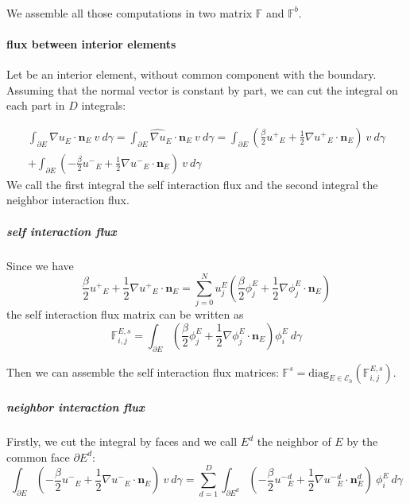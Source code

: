 \documentclass[a4paper,10pt,draft]{article}
\begin{document}
\paragraph{}
We assemble all those computations in two matrix $\mathbb{F}$ and $\mathbb{F}^b$.

\iffalse

\paragraph{flux between interior elements}

Let be an interior element, without common component with the boundary. Assuming that the normal 
vector is constant by part, we can cut the integral on each part in $D$ integrals:

\begin{multline*}
 \int_{\partial E} \widehat{\nabla u}_E \cdot \mathbf{n}_E\ v\ d\gamma 
 = \int_{\partial E} \widehat{\nabla u}_E \cdot \mathbf{n}_E\ v\ d\gamma
 = \int_{\partial E} \left( \frac{\beta}{2} {u^+}_E + \frac{1}{2} \nabla {u^+}_E \cdot \mathbf{n}_E 
\right) \ v\ d\gamma \\
+ \int_{\partial E} \left( -\frac{\beta}{2} {u^-}_E + \frac{1}{2} \nabla {u^-}_E \cdot \mathbf{n}_E 
\right) \ v\ d\gamma
\end{multline*}
 We call the first integral the self interaction flux and the second integral the neighbor 
interaction flux.

\subparagraph{self interaction flux} 
Since we have
\begin{equation*}
 \frac{\beta}{2} {u^+}_E + \frac{1}{2} \nabla {u^+}_E \cdot \mathbf{n}_E = \sum_{j=0}^N u_j^E 
\left( \frac{\beta}{2} \phi_j^E + \frac{1}{2} \nabla \phi_j^E \cdot \mathbf{n}_E \right)
\end{equation*}
the self interaction flux matrix can be written as
\begin{equation*}
 \mathbb{F}_{i,j}^{E,s} = \int_{\partial E} \left( \frac{\beta}{2} \phi_j^E + \frac{1}{2} \nabla 
\phi_j^E \cdot \mathbf{n}_E \right) \phi_i^E \ d \gamma
\end{equation*}

Then we can assemble the self interaction flux matrices: $\mathbb{F}^s = {\mathrm{diag}}_{E 
\in \mathcal{E}_h} (\mathbb{F}_{i,j}^{E,s})$.

\subparagraph{neighbor interaction flux}
Firstly, we cut the integral by faces and we call $E^d$ the neighbor of $E$ by the common face 
$\partial E^d$:
\begin{equation*}
 \int_{\partial E} \left( -\frac{\beta}{2} {u^-}_E + \frac{1}{2} \nabla {u^-}_E \cdot \mathbf{n}_E 
\right) \ v\ d\gamma 
= \sum_{d=1}^D \int_{\partial E^d} \left( -\frac{\beta}{2} {u^-}_E^d + \frac{1}{2} \nabla {u^-}_E^d 
\cdot \mathbf{n}_E^d \right) \ \phi_i^E\ d\gamma
\end{equation*}
\end{document}
